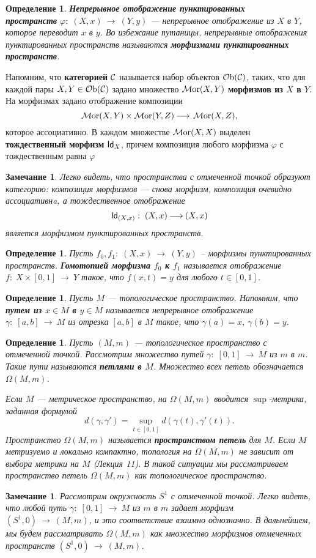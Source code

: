 \documentclass[12pt]{book}
\newcommand{\arrow}{{\:\longrightarrow\:}}
\renewcommand{\phi}{\varphi}
\def\Id{{\operatorname{\sf Id}}}
\newcommand{\Ob}{\operatorname{{\cal O}b}}
\newcommand{\Mor}{\operatorname{{\cal M}or}}
\newcommand{\cac}{{\cal C}}
\theoremstyle{upshape}
\newtheorem{zadacha}{Задача}[chapter]
\theoremstyle{generic}
\newtheorem{opredelenie}[teorema]{Определение}
\newtheorem{remark}[teorema]{Замечание}
\def\замечание{\begin{remark}}
\def\еза{\end{remark}}
\theoremstyle{upshapenonumber}
\newcommand{\следствие}{%
     \refstepcounter{teorema}
     {\noindent\bf Следствие \thechapter.\arabic{teorema}:\ }}
\newcommand{\пример}{%
     \refstepcounter{teorema}
     {\noindent\bf Пример \thechapter.\arabic{teorema}:\ }}
\newcommand{\лемма}{%
     \refstepcounter{teorema}
     {\noindent\bf Лемма \thechapter.\arabic{teorema}:\ }}
\newcommand{\теорема}{%
     \refstepcounter{teorema}
     {\noindent\bf Теорема \thechapter.\arabic{teorema}:\ }}
\newcommand{\утверждение}{%
     \refstepcounter{teorema}
     {\noindent\bf Утверждение \thechapter.\arabic{teorema}:\ }}
\def\бф{\bf}
\def\ем{\em}
\def\задача{\begin{zadacha}}
\def\ез{\end{zadacha}}
\def\еу{\end{ukazanie}}
\def\определение{\begin{opredelenie}}
\def\ео{\end{opredelenie}}
\def\енум{\begin{enumerate}}
\def\ее{\end{enumerate}}
\begin{document}
\определение
{\бф Непрерывное отображение пунктированных \\ пространств}
$\phi:\; (X,x) \arrow (Y,y)$  --- непрерывное отображение
из $X$ в $Y$, которое переводит $x$ в $y$. 
Во избежание путаницы, непрерывные отображения
пунктированных пространств называются {\бф морфизмами
пунктированных пространств}.
\ео


Напомним, что {\бф категорией} $\cac$ называется набор
объектов $\Ob(\cac)$, таких, что для каждой пары
$X, Y \in \Ob(\cac)$ задано множество $\Mor(X,Y)$
{\бф морфизмов из $X$ в $Y$}. На морфизмах задано
отображение композиции
\[
\Mor(X,Y)\times \Mor(Y,Z) \arrow \Mor(X,Z),
\]
которое ассоциативно. В каждом множестве
$\Mor(X,X)$ выделен {\бф тождественный морфизм}
$\Id_X$, причем композиция любого морфизма $\phi$
с тождественным равна $\phi$

\замечание
Легко видеть, что {\ем пространства 
с отмеченной точкой образуют категорию:} композиция
морфизмов --- снова морфизм, композиция очевидно
ассоциативнa, а тождественное
отображение \[ \Id_{(X,x)}:\; (X,x) \arrow (X,x)\]
является морфизмом пунктированных пространств.
\еза

\определение
Пусть $f_0, f_1:\; (X,x) \arrow (Y,y)$ --
морфизмы пунктированных пространств.
{\бф Гомотопией морфизма $f_0$ к $f_1$} называется
отображение $f:\; X \times [0,1] \arrow Y$
такое, что $f(x, t) =y$ для любого $t\in [0,1]$.
\ео


\определение
Пусть $M$ --- топологическое пространство.
Напомним, что {\бф путем из $x\in M$ в $y\in M$}
называется непрерывное отображение 
$\gamma:\; [a,b] \arrow M$
из отрезка $[a,b]$ в $M$ такое, что
$\gamma(a) =x$, $\gamma(b)=y$.
\ео

\определение
Пусть $(M,m)$ --- 
топологическое пространство с отмеченной точкой.
Рассмотрим множество путей $\gamma:\; [0,1] \arrow M$
из $m$ в $m$. Такие пути называются
{\бф петлями в $M$}. Множество всех
петель обозначается $\Omega(M,m)$.

Если $M$ --- метрическое пространство,
на $\Omega(M,m)$ вводится $\sup$-\-ме\-т\-ри\-ка,
заданная формулой
\[
d(\gamma, \gamma') = \sup_{t\in [0,1]} d(\gamma(t), \gamma'(t)).
\] 
Пространство $\Omega(M,m)$ называется
{\бф пространством петель} для $M$.
Если $M$ метризуемо и локально компактно,
топология на $\Omega(M,m)$ не зависит 
от выбора метрики на $M$ (Лекция 11). В такой ситуации
мы рассматриваем пространство петель 
$\Omega(M,m)$ как топологическое пространство.
\ео

\замечание
Рассмотрим окружность $S^1$ с отмеченной точкой.
Легко видеть, что любой путь $\gamma:\; [0,1] \arrow M$ из $m$ в $m$
задает морфизм $(S^1, 0) \arrow (M,m)$, и это соответствие
взаимно однозначно. В дальнейшем, мы будем рассматривать
$\Omega(M,m)$ как множество морфизмов отмеченных пространств
$(S^1, 0) \arrow (M,m)$.
\еза
\end{document}
